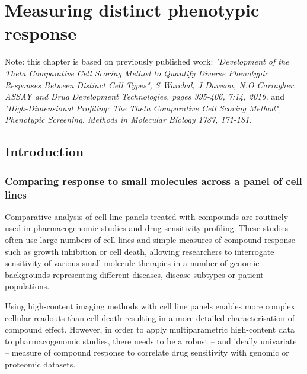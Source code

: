 \documentclass[a4paper,11pt,twoside,openright]{scrbook}
\begin{document}



\chapter{Measuring distinct phenotypic response} \label{chapter:tccs}

\scriptsize{Note: this chapter is based on previously published work: \textit{"Development of the Theta Comparative Cell Scoring Method to Quantify Diverse Phenotypic Responses Between Distinct Cell Types", S Warchal, J Dawson, N.O Carragher. ASSAY and Drug Development Technologies, pages 395-406, 7:14, 2016.} and \textit{"High-Dimensional Profiling: The Theta Comparative Cell Scoring Method", Phenotypic Screening. Methods in Molecular Biology 1787, 171-181}.} 



\section{Introduction}
\normalsize
\subsection{Comparing response to small molecules across a panel of cell lines}
Comparative analysis of cell line panels treated with compounds are routinely used in pharmacogenomic studies and drug sensitivity profiling.
These studies often use large numbers of cell lines and simple measures of compound response such as growth inhibition or cell death, allowing researchers to interrogate sensitivity of various small molecule therapies in a number of genomic backgrounds representing different diseases, disease-subtypes or patient populations.

Using high-content imaging methods with cell line panels enables more complex cellular readouts than cell death resulting in a more detailed characterisation of compound effect.
However, in order to apply multiparametric high-content data to pharmacogenomic studies, there needs to be a robust -- and ideally univariate -- measure of compound response to correlate drug sensitivity with genomic or proteomic datasets.
\end{document}
